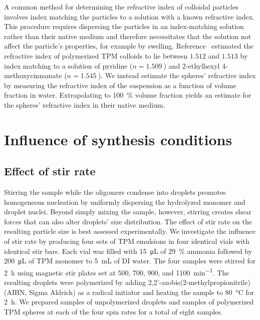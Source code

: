 A common method for determining the refractive index of colloidal particles
involves index matching the particles to a solution with a known refractive index.
This procedure requires dispersing the particles in an index-matching solution
rather than their native medium and therefore necessitates
that the solution not affect the particle's properties, for
example by swelling.  Reference~\cite{vanderwel17} estimated the
refractive index of polymerized TPM colloids to lie between $\num{1.512}$ and $\num{1.513}$
by index matching to a solution of pyridine ($n = \SI{1.509}{}$) and \num{2}-ethylhexyl
\num{4}-methoxycinnamate ($n = \SI{1.545}{}$). We instead estimate the spheres'
refractive index by measuring the refractive index of the suspension as a function of
volume fraction in water. Extrapolating  to \SI{100}{\percent} volume fraction
yields an estimate for the spheres' refractive index \cite{alexander81} in their native medium.

\section{Influence of synthesis conditions}
\subsection{Effect of stir rate}
\label{ssec:stir}
Stirring the sample while the oligomers condense into droplets promotes homogeneous
nucleation by uniformly dispersing the hydrolyzed monomer and droplet nuclei.
Beyond simply mixing the sample, however, stirring creates shear forces that can
also alter droplets' size distribution.
The effect of stir rate on the resulting particle size is best assessed
experimentally.
We investigate the influence of stir rate by producing four sets of TPM emulsions
in four identical vials with identical stir bars. Each vial was filled with
\SI{15}{\micro\liter} of \SI{29}{\percent} ammonia followed by
\SI{200}{\micro\liter} of TPM monomer to \SI{5}{\milli\liter} of DI water.
The four samples were stirred for \SI{2}{\hour}
using magnetic stir plates set at \num{500}, \num{700}, \num{900}, and
\SI{1100}{\minute^{-1}}. 
The resulting droplets were polymerized by adding
\num{2},\num{2}'-azobis(\num{2}-methylpropionitrile) (AIBN, Sigma Aldrich)
as a radical initiator and %
heating the sample to \SI{80}{\celsius} for \SI{2}{\hour}.
We prepared samples of unpolymerized droplets and samples of polymerized TPM spheres
at each of the four spin rates for a total of eight samples.

